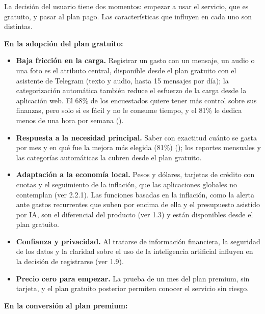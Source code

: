 La decisión del usuario tiene dos momentos: empezar a usar el servicio,
que es gratuito, y pasar al plan pago. Las características que influyen
en cada uno son distintas.

\textbf{En la adopción del plan gratuito:}

\begin{itemize}
\tightlist
\item
  \textbf{Baja fricción en la carga.} Registrar un gasto con un mensaje,
  un audio o una foto es el atributo central, disponible desde el plan
  gratuito con el asistente de Telegram (texto y audio, hasta 15
  mensajes por día); la categorización automática también reduce el
  esfuerzo de la carga desde la aplicación web. El 68\% de los
  encuestados quiere tener más control sobre sus finanzas, pero solo si
  es fácil y no le consume tiempo, y el 81\% le dedica menos de una hora
  por semana ().
\item
  \textbf{Respuesta a la necesidad principal.} Saber con exactitud
  cuánto se gasta por mes y en qué fue la mejora más elegida (81\%)
  (); los reportes
  mensuales y las categorías automáticas la cubren desde el plan
  gratuito.
\item
  \textbf{Adaptación a la economía local.} Pesos y dólares, tarjetas de
  crédito con cuotas y el seguimiento de la inflación, que las
  aplicaciones globales no contemplan (ver 2.2.1). Las funciones basadas
  en la inflación, como la alerta ante gastos recurrentes que suben por
  encima de ella y el presupuesto asistido por IA, son el diferencial
  del producto (ver 1.3) y están disponibles desde el plan gratuito.
\item
  \textbf{Confianza y privacidad.} Al tratarse de información
  financiera, la seguridad de los datos y la claridad sobre el uso de la
  inteligencia artificial influyen en la decisión de registrarse (ver
  1.9).
\item
  \textbf{Precio cero para empezar.} La prueba de un mes del plan
  premium, sin tarjeta, y el plan gratuito posterior permiten conocer el
  servicio sin riesgo.
\end{itemize}

\textbf{En la conversión al plan premium:}

